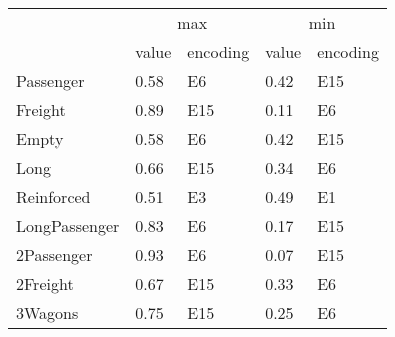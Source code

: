 \begin{tabular}{lllll}
\toprule
 & \multicolumn{2}{c}{max} & \multicolumn{2}{c}{min} \\
 & value & encoding & value & encoding \\
\midrule
Passenger & 0.58 & E6 & 0.42 & E15 \\
Freight & 0.89 & E15 & 0.11 & E6 \\
Empty & 0.58 & E6 & 0.42 & E15 \\
Long & 0.66 & E15 & 0.34 & E6 \\
Reinforced & 0.51 & E3 & 0.49 & E1 \\
LongPassenger & 0.83 & E6 & 0.17 & E15 \\
2Passenger & 0.93 & E6 & 0.07 & E15 \\
2Freight & 0.67 & E15 & 0.33 & E6 \\
3Wagons & 0.75 & E15 & 0.25 & E6 \\
\bottomrule
\end{tabular}
